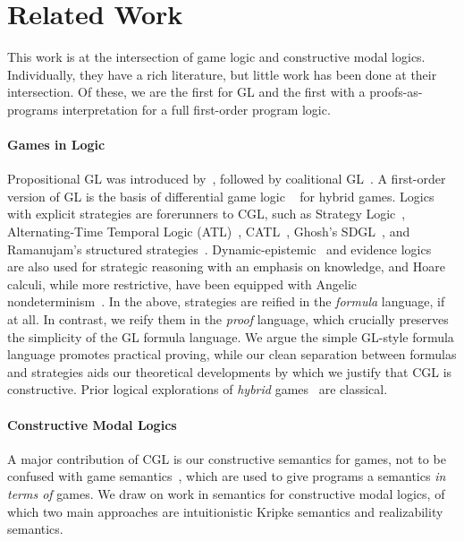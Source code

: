 \documentclass[12pt]{cmuthesis}
\theoremstyle{definition}
\theoremstyle{remark}
\newcommand{\CGL}{\textsf{CGL}\xspace}
\newcommand{\GL}{GL\xspace}
\begin{document}
\section{Related Work}
\label{sec:cgl-relwork}
This work is at the intersection of game logic and constructive modal logics.
Individually, they have a rich literature, but little work has been done at their intersection.
Of these, we are the first for \GL and the first with a proofs-as-programs interpretation for a full first-order program logic.

\paragraph{Games in Logic} 
Propositional \GL was introduced by~\cite{DBLP:conf/focs/Parikh83}, followed by coalitional \GL~\cite{DBLP:journals/logcom/Pauly02}.
A first-order version of \GL is the basis of differential game logic \dGL~\cite{DBLP:journals/tocl/Platzer15} for hybrid games.
Logics with explicit strategies are forerunners to \CGL, such as Strategy Logic~\cite{DBLP:conf/concur/ChatterjeeHP07}, Alternating-Time Temporal Logic (ATL)~\cite{DBLP:journals/jacm/AlurHK02}, CATL~\cite{DBLP:conf/atal/HoekJW05}, Ghosh's SDGL~\cite{ghosh2008strategies}, and Ramanujam's structured strategies~\cite{DBLP:conf/kr/RamanujamS08}.
Dynamic-epistemic~\cite{DBLP:series/lncs/Benthem15,DBLP:journals/games/BenthemPR11,van2001games} and evidence logics~\cite{DBLP:journals/sLogica/BenthemP11} are also used for strategic reasoning with an emphasis on knowledge, and Hoare calculi, while more restrictive, have been equipped with Angelic nondeterminism~\cite{DBLP:journals/corr/Mamouras16}.
In the above, strategies are reified in the \emph{formula} language, if at all.
In contrast, we reify them in the \emph{proof} language, which crucially preserves the simplicity of the \GL formula language.
We argue the simple \GL-style formula language promotes practical proving, while our clean separation between formulas and strategies aids our theoretical developments by which we justify that \CGL is constructive.
Prior logical explorations of \emph{hybrid} games~\cite{DBLP:conf/cade/QueselP12,DBLP:journals/tocl/Platzer15,DBLP:journals/tocl/Platzer17,DBLP:conf/cade/Platzer18} are classical.

\paragraph{Constructive Modal Logics}
A major contribution of \CGL is our constructive semantics for games, not to be confused with game semantics~\cite{DBLP:journals/iandc/AbramskyJM00}, which are used to give programs a semantics \emph{in terms of} games.
We draw on work in semantics for constructive modal logics, of which two main approaches are intuitionistic Kripke semantics and realizability semantics.
\end{document}
